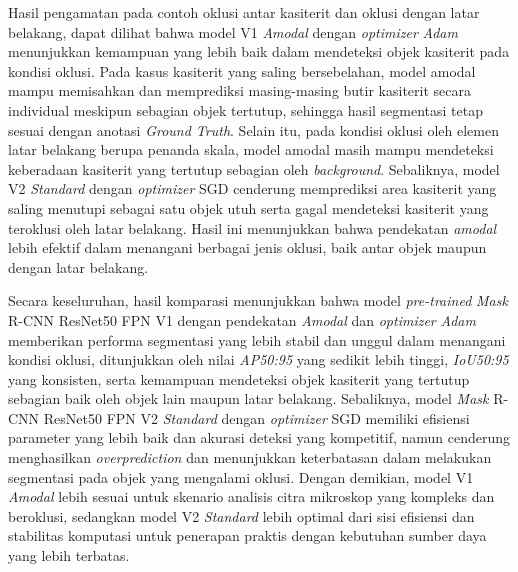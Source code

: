 Hasil pengamatan pada contoh oklusi antar kasiterit dan oklusi dengan latar belakang, dapat dilihat bahwa model V1 \textit{Amodal} dengan \textit{optimizer} \textit{Adam} menunjukkan kemampuan yang lebih baik dalam mendeteksi objek kasiterit pada kondisi oklusi. Pada kasus kasiterit yang saling bersebelahan, model amodal mampu memisahkan dan memprediksi masing-masing butir kasiterit secara individual meskipun sebagian objek tertutup, sehingga hasil segmentasi tetap sesuai dengan anotasi \textit{Ground Truth}. Selain itu, pada kondisi oklusi oleh elemen latar belakang berupa penanda skala, model amodal masih mampu mendeteksi keberadaan kasiterit yang tertutup sebagian oleh \textit{background}. Sebaliknya, model V2 \textit{Standard} dengan \textit{optimizer} SGD cenderung memprediksi area kasiterit yang saling menutupi sebagai satu objek utuh serta gagal mendeteksi kasiterit yang teroklusi oleh latar belakang. Hasil ini menunjukkan bahwa pendekatan \textit{amodal} lebih efektif dalam menangani berbagai jenis oklusi, baik antar objek maupun dengan latar belakang. \par

Secara keseluruhan, hasil komparasi menunjukkan bahwa model \textit{pre-trained} \textit{Mask} R-CNN ResNet50 FPN V1 dengan pendekatan \textit{Amodal} dan \textit{optimizer} \textit{Adam} memberikan performa segmentasi yang lebih stabil dan unggul dalam menangani kondisi oklusi, ditunjukkan oleh nilai \textit{AP50:95} yang sedikit lebih tinggi, \textit{IoU50:95} yang konsisten, serta kemampuan mendeteksi objek kasiterit yang tertutup sebagian baik oleh objek lain maupun latar belakang. Sebaliknya, model \textit{Mask} R-CNN ResNet50 FPN V2 \textit{Standard} dengan \textit{optimizer} SGD memiliki efisiensi parameter yang lebih baik dan akurasi deteksi yang kompetitif, namun cenderung menghasilkan \textit{overprediction} dan menunjukkan keterbatasan dalam melakukan segmentasi pada objek yang mengalami oklusi. Dengan demikian, model V1 \textit{Amodal} lebih sesuai untuk skenario analisis citra mikroskop yang kompleks dan beroklusi, sedangkan model V2 \textit{Standard} lebih optimal dari sisi efisiensi dan stabilitas komputasi untuk penerapan praktis dengan kebutuhan sumber daya yang lebih terbatas. \par

